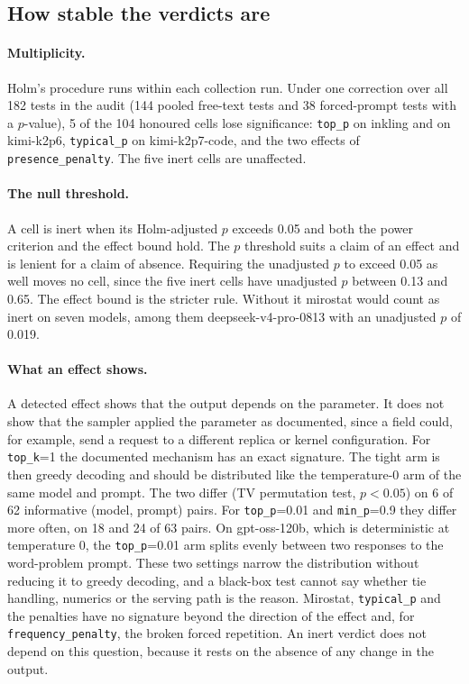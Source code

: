 \documentclass[10pt]{article}
\newcommand{\p}[1]{\texttt{#1}}
\begin{document}
\subsection{How stable the verdicts are}
\label{sec:robust}

\paragraph{Multiplicity.} Holm's procedure runs within each collection run. Under one correction over all 182 tests in the audit (144 pooled free-text tests and 38 forced-prompt tests with a $p$-value), 5 of the 104 honoured cells lose significance: \p{top\_p} on inkling and on kimi-k2p6, \p{typical\_p} on kimi-k2p7-code, and the two effects of \p{presence\_penalty}. The five inert cells are unaffected.

\paragraph{The null threshold.} A cell is inert when its Holm-adjusted $p$ exceeds 0.05 and both the power criterion and the effect bound hold. The $p$ threshold suits a claim of an effect and is lenient for a claim of absence. Requiring the unadjusted $p$ to exceed 0.05 as well moves no cell, since the five inert cells have unadjusted $p$ between 0.13 and 0.65. The effect bound is the stricter rule. Without it mirostat would count as inert on seven models, among them deepseek-v4-pro-0813 with an unadjusted $p$ of 0.019.

\paragraph{What an effect shows.} A detected effect shows that the output depends on the parameter. It does not show that the sampler applied the parameter as documented, since a field could, for example, send a request to a different replica or kernel configuration. For \p{top\_k}=1 the documented mechanism has an exact signature. The tight arm is then greedy decoding and should be distributed like the temperature-0 arm of the same model and prompt. The two differ (TV permutation test, $p < 0.05$) on 6 of 62 informative (model, prompt) pairs. For \p{top\_p}=0.01 and \p{min\_p}=0.9 they differ more often, on 18 and 24 of 63 pairs. On gpt-oss-120b, which is deterministic at temperature 0, the \p{top\_p}=0.01 arm splits evenly between two responses to the word-problem prompt. These two settings narrow the distribution without reducing it to greedy decoding, and a black-box test cannot say whether tie handling, numerics or the serving path is the reason. Mirostat, \p{typical\_p} and the penalties have no signature beyond the direction of the effect and, for \p{frequency\_penalty}, the broken forced repetition. An inert verdict does not depend on this question, because it rests on the absence of any change in the output.
\end{document}
